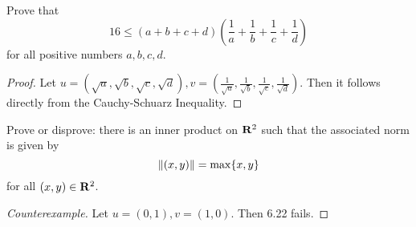 \begin{exercise}{11}
	Prove that
	\[
		16 \le (a + b + c + d)\left(\frac{1}{a} + \frac{1}{b} + \frac{1}{c} + \frac{1}{d}\right)
	\]
	for all positive numbers \( a, b, c, d \).
\end{exercise}

\begin{proof}
	Let \( u = \left(\sqrt{a}, \sqrt{b}, \sqrt{c}, \sqrt{d}\right), v = \left(\frac{1}{\sqrt{a}}, \frac{1}{\sqrt{b}}, \frac{1}{\sqrt{c}}, \frac{1}{\sqrt{d}}\right) \). Then it follows directly from the Cauchy-Schuarz Inequality.
\end{proof}

\begin{exercise}{17}
	Prove or disprove: there is an inner product on \( \mathbf{R}^{2} \) such that the associated norm is given by
	\[
		\norm{(x, y)} = \max\{x, y\}
	\]
	for all \( (x, y) \in \mathbf{R}^{2} \).
\end{exercise}

\begin{proof}[Counterexample]
	Let \( u = (0, 1), v = (1, 0) \). Then 6.22 fails.
\end{proof}
